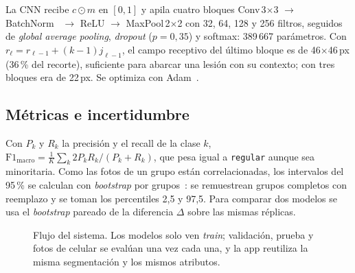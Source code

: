 \documentclass[conference]{IEEEtran}
\newcommand{\cls}[1]{\texttt{#1}}
\begin{document}
La CNN recibe $c\odot m$ en $[0,1]$ y apila cuatro bloques Conv\,3$\times$3 $\to$ BatchNorm~\cite{ioffe2015} $\to$ ReLU $\to$ MaxPool\,2$\times$2 con 32, 64, 128 y 256 filtros, seguidos de \emph{global average pooling}, \emph{dropout} ($p=0{,}35$) y softmax: 389\,667 parámetros. Con $r_\ell=r_{\ell-1}+(k-1)j_{\ell-1}$, el campo receptivo del último bloque es de 46$\times$46\,px (36\,\% del recorte), suficiente para abarcar una lesión con su contexto; con tres bloques era de 22\,px. Se optimiza con Adam~\cite{kingma2015}.

\subsection{Métricas e incertidumbre}

Con $P_k$ y $R_k$ la precisión y el recall de la clase $k$, $\mathrm{F1}_{\text{macro}}=\frac{1}{K}\sum_k 2P_kR_k/(P_k+R_k)$, que pesa igual a \cls{regular} aunque sea minoritaria. Como las fotos de un grupo están correlacionadas, los intervalos del 95\,\% se calculan con \emph{bootstrap} por grupos~\cite{efron1993}: se remuestrean grupos completos con reemplazo y se toman los percentiles 2,5 y 97,5. Para comparar dos modelos se usa el \emph{bootstrap} pareado de la diferencia $\Delta$ sobre las mismas réplicas.

\begin{figure}[t]
\centering
{}
\caption{Flujo del sistema. Los modelos solo ven \emph{train}; validación, prueba y fotos de celular se evalúan una vez cada una, y la app reutiliza la misma segmentación y los mismos atributos.}
\label{fig:flujo}
\end{figure}
\end{document}
